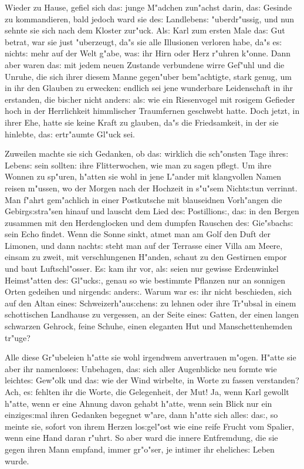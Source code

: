\documentclass[oneside,12pt]{book}
\newcommand{\s}{s:}%
\begin{document}
Wieder zu Hause, gefiel sich da{\s} junge M"adchen zun"achst
darin, da{\s} Gesinde zu kommandieren, bald jedoch ward sie de{\s}
Landleben{\s} "uberdr"ussig, und nun sehnte sie sich nach dem
Kloster zur"uck. Al{\s} Karl zum ersten Male da{\s} Gut betrat,
war sie just "uberzeugt, da"s sie alle Illusionen verloren habe,
da"s e{\s} nicht{\s} mehr auf der Welt g"abe, wa{\s} ihr Hirn oder
Herz r"uhren k"onne. Dann aber waren da{\s} mit jedem neuen
Zustande verbundene wirre Gef"uhl und die Unruhe, die sich ihrer
diesem Manne gegen"uber bem"achtigte, stark genug, um in ihr den
Glauben zu erwecken: endlich sei jene wunderbare Leidenschaft in
ihr erstanden, die bi{\s}her nicht ander{\s} al{\s} wie ein
Riesenvogel mit rosigem Gefieder hoch in der Herrlichkeit
himmlischer Traumfernen geschwebt hatte. Doch jetzt, in ihrer Ehe,
hatte sie keine Kraft zu glauben, da"s die Friedsamkeit, in der
sie hinlebte, da{\s} ertr"aumte Gl"uck sei.


\newpage\begin{center}
{\large \so{Siebente{\s} Kapitel}}\bigskip\bigskip
\end{center}

Zuweilen machte sie sich Gedanken, ob da{\s} wirklich die
sch"onsten Tage ihre{\s} Leben{\s} sein sollten: ihre
Flitterwochen, wie man zu sagen pflegt. Um ihre Wonnen zu sp"uren,
h"atten sie wohl in jene L"ander mit klangvollen Namen reisen
m"ussen, wo der Morgen nach der Hochzeit in s"u"sem Nicht{\s}tun
verrinnt. Man f"ahrt gem"achlich in einer Postkutsche mit
blauseidnen Vorh"angen die Gebirg{\s}stra"sen hinauf und lauscht
dem Lied de{\s} Postillion{\s}, da{\s} in den Bergen zusammen mit
den Herdenglocken und dem dumpfen Rauschen de{\s} Gie"sbach{\s}
sein Echo findet. Wenn die Sonne sinkt, atmet man am Golf den Duft
der Limonen, und dann nacht{\s} steht man auf der Terrasse einer
Villa am Meere, einsam zu zweit, mit verschlungenen H"anden,
schaut zu den Gestirnen empor und baut Luftschl"osser. E{\s} kam
ihr vor, al{\s} seien nur gewisse Erdenwinkel Heimst"atten de{\s}
Gl"uck{\s}, genau so wie bestimmte Pflanzen nur an sonnigen Orten
gedeihen und nirgend{\s} ander{\s}. Warum war e{\s} ihr nicht
beschieden, sich auf den Altan eine{\s} Schweizerh"au{\s}chen{\s}
zu lehnen oder ihre Tr"ubsal in einem schottischen Landhause zu
vergessen, an der Seite eine{\s} Gatten, der einen langen
schwarzen Gehrock, feine Schuhe, einen eleganten Hut und
Manschettenhemden tr"uge?

Alle diese Gr"ubeleien h"atte sie wohl irgendwem anvertrauen
m"ogen. H"atte sie aber ihr namenlose{\s} Unbehagen, da{\s} sich
aller Augenblicke neu formte wie leichte{\s} Gew"olk und da{\s}
wie der Wind wirbelte, in Worte zu fassen verstanden? Ach, e{\s}
fehlten ihr die Worte, die Gelegenheit, der Mut! Ja, wenn Karl
gewollt h"atte, wenn er eine Ahnung davon gehabt h"atte, wenn sein
Blick nur ein einzige{\s}mal ihren Gedanken begegnet w"are, dann
h"atte sich alle{\s} da{\s}, so meinte sie, sofort von ihrem
Herzen lo{\s}gel"ost wie eine reife Frucht vom Spalier, wenn eine
Hand daran r"uhrt. So aber ward die innere Entfremdung, die sie
gegen ihren Mann empfand, immer gr"o"ser, je intimer ihr
eheliche{\s} Leben wurde.
\end{document}
